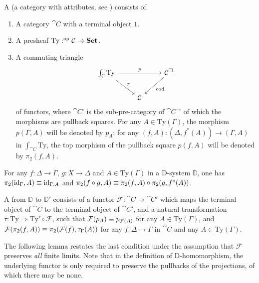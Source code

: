 \begin{defn}
A  (a category with attributes, see \cite{Hofmann_syntax_semantics}) consists of
\begin{enumerate}
\item A category $\cat{C}$ with a terminal object $1$.
\item A presheaf $\mathrm{Ty}:^{\mathrm{op}}{\mathcal{C}}\to\mathbf{Set}$. 
\item A commuting triangle
\begin{equation*}
\begin{tikzcd}
\int_{\cat{C}}\mathrm{Ty} \arrow[rr,"p"] \arrow[dr,"\pi"] & & \cat{C}^\square \arrow[dl,"\mathrm{cod}"] \\
& \cat{C}
\end{tikzcd}
\end{equation*}
of functors, where $\cat{C}^\square$ is the sub-pre-category of $\cat{C}^{\to}$ of
which the morphisms are pullback squares. For any $A\in\mathrm{Ty}(\Gamma)$,
the morphism $p(\Gamma,A)$ will be denoted by $p_A$; for any
$(f,A):(\Delta,f^\ast(A))\to(\Gamma,A)$ in $\int_{\cat{C}}\mathrm{Ty}$, the top
morphism of the pullback square $p(f,A)$ will be denoted by $\pi_2(f,A)$.
\end{enumerate}
\end{defn}

\begin{rmk}
For any $f:\Delta\to\Gamma$, $g:X\to\Delta$ and $A\in\mathrm{Ty}(\Gamma)$ in a
D-system $\mathbb{D}$, one has 
$\pi_2(\catid{\Gamma},A)\jdeq\catid{\ctxext{\Gamma}{A}}$ and
$\pi_2(f\circ g,A)\equiv \pi_2(f,A)\circ\pi_2(g,f^\ast(A))$.
\end{rmk}

\begin{defn}
A  from $\mathbb{D}$ to $\mathbb{D}'$ consists of a functor 
$\mathcal{F}:\cat{C}\to\cat{C}'$ which maps the terminal object of
$\cat{C}$ to the terminal object of $\cat{C}'$, and a natural transformation
$\tau:\mathrm{Ty}\Rightarrow\mathrm{Ty}'\circ\mathcal{F}$, such that 
$\mathcal{F}(p_A)\equiv p_{\mathcal{F}(A)}$ for any
$A\in\mathrm{Ty}(\Gamma)$, and $\mathcal{F}(\pi_2(f,A))\equiv
\pi_2(\mathcal{F}(f),\tau_\Gamma(A))$ for any $f:\Delta\to\Gamma$ in $\cat{C}$ and
any $A\in\mathrm{Ty}(\Gamma)$. 
\end{defn}

The following lemma restates the last condition under the assumption that
$\mathcal{F}$ preserves \emph{all} finite limits. Note that
in the definition of D-homomorphism, the underlying functor is only
required to preserve the pullbacks of the projections, of which there may be
none.


